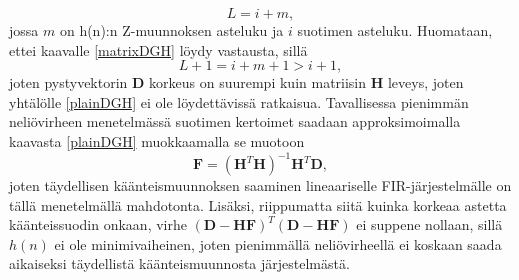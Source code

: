 \documentclass[finnish,12pt]{article}
\begin{document}
\begin{equation}
L = i+m,
\end{equation} jossa $m$ on h(n):n Z-muunnoksen asteluku ja $i$ suotimen asteluku. Huomataan, ettei kaavalle \eqref{matrixDGH} löydy vastausta, sillä \begin{equation}
L + 1 = i + m + 1 > i + 1, 
\end{equation} joten pystyvektorin \textbf{D} korkeus on suurempi kuin matriisin \textbf{H} leveys, joten yhtälölle \eqref{plainDGH} ei ole löydettävissä ratkaisua. Tavallisessa pienimmän neliövirheen menetelmässä suotimen kertoimet saadaan approksimoimalla kaavasta \eqref{plainDGH} muokkaamalla se muotoon \begin{equation}
\textbf{F}=(\textbf{H}^T \textbf{H})^{-1}\textbf{H}^T \textbf{D}, 
\end{equation} joten täydellisen käänteismuunnoksen saaminen lineaariselle FIR-järjestelmälle on tällä menetelmällä mahdotonta. Lisäksi, riippumatta siitä kuinka korkeaa astetta käänteissuodin onkaan, virhe $(\textbf{D}-\textbf{HF})^T(\textbf{D}-\textbf{HF})$ ei suppene nollaan, sillä $h(n)$ ei ole minimivaiheinen, joten pienimmällä neliövirheellä ei koskaan saada aikaiseksi täydellistä käänteismuunnosta järjestelmästä. \cite{MMiyoshi1988}
\end{document}
